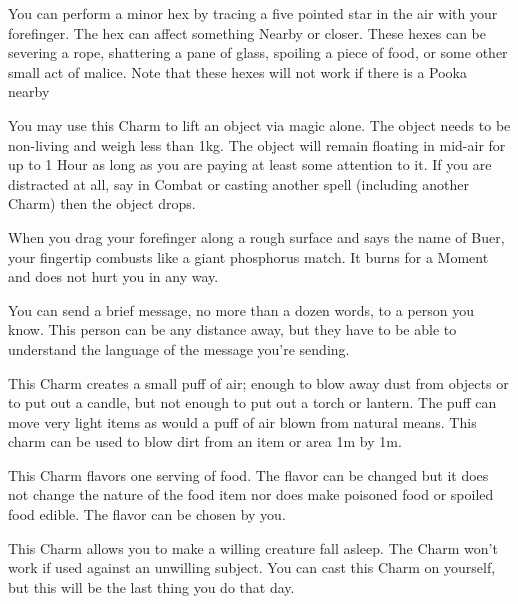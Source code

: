 
  You can perform a minor hex by tracing a five pointed star in the air with your forefinger. The hex can affect something Nearby or closer.  These hexes can be severing a rope, shattering a pane of glass, spoiling a piece of food, or some other small act of malice.  Note that these hexes will not work if there is a Pooka nearby


  You may use this Charm to lift an object via magic alone. The object needs to be non-living and weigh less than 1kg. The object will remain floating in mid-air for up to 1 Hour as long as you are paying at least some attention to it. If you are distracted at all, say in Combat or casting another spell (including another Charm) then the object drops. 


  When you drag your forefinger along a rough surface and says the name of Buer, your fingertip combusts like a giant phosphorus match. It burns for a Moment and does not hurt you in any way.


  You can send a brief message, no more than a dozen words, to a person you know. This person can be any distance away, but they have to be able to understand the language of the message you're sending.


  This Charm creates a small puff of air; enough to blow away dust from objects or to put out a candle, but not enough to put out a torch or lantern. The puff can move very light items as would a puff of air blown from natural means. This charm can be used to blow dirt from an item or area 1m by 1m. 


  This Charm flavors one serving of food. The flavor can be changed but it does not change the nature of the food item nor does make poisoned food or spoiled food edible. The flavor can be chosen by you. 


  This Charm allows you to make a willing creature fall asleep. The Charm won't work if used against an unwilling subject. You can cast this Charm on yourself, but this will be the last thing you do that day.

